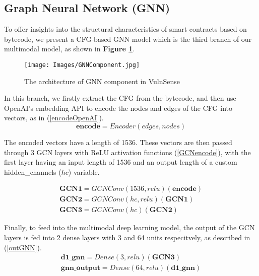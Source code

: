 \subsection{Graph Neural Network (GNN)}
To offer insights into the structural characteristics of smart contracts based on bytecode, we present a CFG-based GNN model which is the third branch of our multimodal model, as shown in \textbf{Figure \ref{fig:gnncomponent}}. 
\begin{figure}[hpt]
\centering
\texttt{[image: Images/GNNComponent.jpg]}
\caption{The architecture of GNN component in VulnSense} \label{fig:gnncomponent}
\end{figure}

In this branch, we firstly extract the CFG from the bytecode, and then use OpenAI's embedding API to encode the nodes and edges of the CFG into vectors, as in (\ref{encodeOpenAI}).
\begin{equation}
    \mathbf{encode} = Encoder(edges, nodes)
    \label{encodeOpenAI}
\end{equation}

The encoded vectors have a length of 1536. These vectors are then passed through 3 GCN layers with ReLU activation functions (\ref{GCNencode}), with the first layer having an input length of 1536 and an output length of a custom hidden\_channels ($hc$) variable.

\begin{equation}
\begin{split}
    \mathbf{GCN1} = GCNConv(1536, relu)(\mathbf{encode})
    \\
    \mathbf{GCN2} = GCNConv(hc, relu)(\mathbf{GCN1})
    \\
    \mathbf{GCN3} = GCNConv(hc)(\mathbf{GCN2})
    \label{GCNencode}
\end{split}
\end{equation}

Finally, to feed into the multimodal deep learning model, the output of the GCN layers is fed into 2 dense layers with 3 and 64 units respecitvely, as described in (\ref{outGNN}). 
\begin{equation}
\begin{split}
    \mathbf{d1\_gnn} = Dense(3, relu)(\mathbf{GCN3})\\
    \mathbf{gnn\_output} = Dense(64, relu)(\mathbf{d1\_gnn})
    \label{outGNN}
\end{split}
\end{equation}

